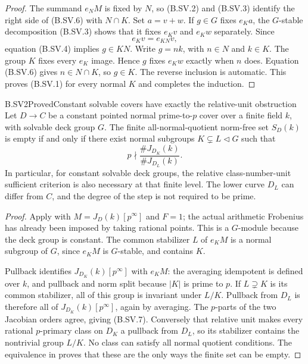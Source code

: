 \begin{proof}
The summand $e_NM$ is fixed by $N$, so (B.SV.2) and
(B.SV.3) identify the right side of (B.SV.6) with $N\cap K$.
Set $a=v+w$. If $g\in G$ fixes $e_Ka$, the $G$-stable
decomposition (B.SV.3) shows that it fixes $e_Kv$ and
$e_Kw$ separately. Since
\[
                         e_Kv=e_{KN}v,
\]
equation (B.SV.4) implies $g\in KN$. Write $g=nk$, with
$n\in N$ and $k\in K$. The group $K$ fixes every $e_K$
image. Hence $g$ fixes $e_Kw$ exactly when $n$ does.
Equation (B.SV.6) gives $n\in N\cap K$, so $g\in K$.
The reverse inclusion is automatic. This proves (B.SV.1)
for every normal $K$ and completes the induction.
\end{proof}

\begin{claim}{B.SV2}{Proved}{Constant solvable covers have exactly the relative-unit obstruction}
Let $D\to C$ be a constant pointed normal prime-to-$p$
cover over a finite field $k$, with solvable deck group $G$.
The finite all-normal-quotient norm-free set $S_D(k)$ is empty
if and only if there exist normal subgroups
$K\subsetneq L\triangleleft G$ such that
\[
                         p\nmid
                   \frac{\#J_{D_K}(k)}{\#J_{D_L}(k)}.          \tag{B.SV.7}
\]
In particular, for constant solvable deck groups, the relative
class-number-unit sufficient criterion is also necessary at
that finite level. The lower curve $D_L$ can differ from $C$,
and the degree of the step is not required to be prime.
\end{claim}
\begin{proof}
Apply  with
$M=J_D(k)[p^\infty]$ and $F=1$; the actual arithmetic
Frobenius has already been imposed by taking rational points.
This is a $G$-module because the deck group is constant.
The common stabilizer $L$ of $e_KM$ is a normal subgroup of
$G$, since $e_KM$ is $G$-stable, and contains $K$.

Pullback identifies $J_{D_K}(k)[p^\infty]$ with $e_KM$:
the averaging idempotent is defined over $k$, and pullback
and norm split because $|K|$ is prime to $p$.
If $L\supsetneq K$ is its common stabilizer, all of this
group is invariant under $L/K$. Pullback from $D_L$ is
therefore all of $J_{D_K}(k)[p^\infty]$, again by averaging.
The $p$-parts of the two Jacobian orders agree, giving
(B.SV.7). Conversely that relative unit makes every rational
$p$-primary class on $D_K$ a pullback from $D_L$, so its
stabilizer contains the nontrivial group $L/K$. No class can
satisfy all normal quotient conditions. The equivalence in
 proves that these are the only ways the
finite set can be empty.
\end{proof}

